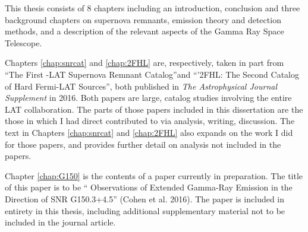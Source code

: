 This thesis consists of 8 chapters including an introduction, conclusion and three background chapters on supernova remnants, \gam{} emission theory and detection methods, and a description of the relevant aspects of the \Fermi{} Gamma Ray Space Telescope.

Chapters \ref{chap:snrcat} and  \ref{chap:2FHL} are, respectively, taken in part from ``The First \Fermi{}-LAT Supernova Remnant Catalog''and ``'2FHL: The Second Catalog of Hard Fermi-LAT Sources'', both published in \emph{The Astrophysical Journal Supplement} in 2016. Both papers are large, catalog studies involving the entire LAT collaboration. The parts of those papers included in this dissertation are the those in which I had direct contributed to via analysis, writing, discussion. The text in Chapters \ref{chap:snrcat} and \ref{chap:2FHL} also expands on the work I did for those papers, and provides further detail on analysis not included in the papers.

Chapter \ref{chap:G150} is the contents of a paper currently in preparation. The title of this paper is to be ``\FermiLat{} Observations of Extended Gamma-Ray Emission in the Direction of SNR G150.3+4.5'' (Cohen et al. 2016). The paper is included in entirety in this thesis, including additional supplementary material not to be included in the journal article. 


